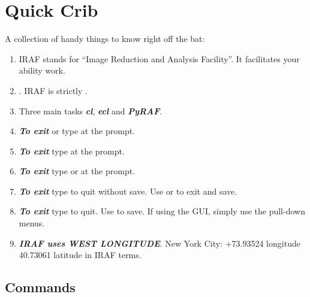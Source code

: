 \clearpage
\renewcommand{\footerfilename}{QuickCrib.tex}

\section{Quick Crib}  \label{sec:QuickCrib}

A collection of handy things to know right off the bat:
\vspace{-.15cm}
\begin{enumerate}\addtolength{\itemsep}{-0.5\baselineskip}
   \item   IRAF stands for ``Image Reduction and Analysis Facility''. It facilitates your ability work.
   \item   {}. IRAF is strictly .
   \item   Three main tasks \textbf{\emph{cl}}, \textbf{\emph{ecl}} and \textbf{\emph{PyRAF}}.
   \item   \textbf{\emph{To exit}}  or  type  at the prompt.
   \item   \textbf{\emph{To exit}}  type  at the prompt.
   \item   \textbf{\emph{To exit}}  type  or  at the prompt.
   \item   \textbf{\emph{To exit}}  type  to quit without save. Use  or  to exit and save.
   \item   \textbf{\emph{To exit}}  type  to quit. Use  to save. If using the
           GUI, simply use the pull-down menus.
   \item   \textbf{\emph{IRAF uses WEST LONGITUDE}}. New York City: +73.93524 longitude 40.73061 latitude in IRAF terms.
\end{enumerate}

\subsection{Commands}

